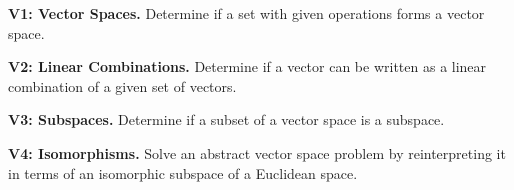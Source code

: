 

\begin{moduleStandards}
  \item \textbf{V1: Vector Spaces.}
        Determine if a set with given operations forms a vector space.
  \item \textbf{V2: Linear Combinations.}
        Determine if a vector can be written as a linear combination of
        a given set of vectors.
  \item \textbf{V3: Subspaces.}
        Determine if a subset of a vector space is a subspace.
  \item \textbf{V4: Isomorphisms.}
        Solve an abstract vector space problem by reinterpreting it in
        terms of an isomorphic subspace of a Euclidean space.
\end{moduleStandards}




